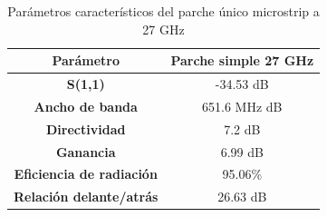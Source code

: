 \begin{table}[H]
  
  
   \small %
   \centering %
   \begin{tabular}{c c} %
   \toprule[\heavyrulewidth]\toprule[\heavyrulewidth]
   \textbf{Parámetro} & \textbf{Parche simple 27 GHz} \\ 
   \midrule
   \textbf{S(1,1)} & -34.53 dB \\
   \textbf{Ancho de banda} & 651.6 MHz dB \\
   \textbf{Directividad} & 7.2 dB \\
   \textbf{Ganancia} & 6.99 dB \\
   \textbf{Eficiencia de radiación} & 95.06\% \\
   \textbf{Relación delante/atrás} & 26.63 dB \\

   \bottomrule[\heavyrulewidth] 
   \end{tabular}
   \caption{Parámetros característicos del parche único microstrip a 27 GHz} 
    \label{tab:res1x13}
\end{table}